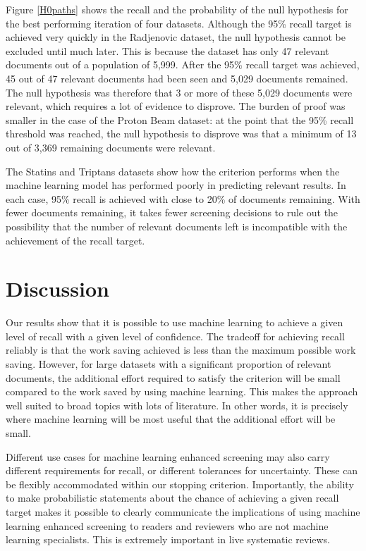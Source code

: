 \documentclass{bmcart}
\begin{document}
	Figure \ref{H0paths} shows the recall and the probability of the null hypothesis for the best performing iteration of four datasets. Although the 95\% recall target is achieved very quickly in the Radjenovic dataset, the null hypothesis cannot be excluded until much later. This is because the dataset has only 47 relevant documents out of a population of 5,999. After the 95\% recall target was achieved, 45 out of 47 relevant documents had been seen and 5,029 documents remained. The null hypothesis was therefore that 3 or more of these 5,029 documents were relevant, which requires a lot of evidence to disprove. The burden of proof was smaller in the case of the Proton Beam dataset: at the point that the 95\% recall threshold was reached, the null hypothesis to disprove was that a minimum of 13 out of 3,369 remaining documents were relevant. 

	The Statins and Triptans datasets show how the criterion performs when the machine learning model has performed poorly in predicting relevant results. In each case, 95\% recall is achieved with close to 20\% of documents remaining. With fewer documents remaining, it takes fewer screening decisions to rule out the possibility that the number of relevant documents left is incompatible with the achievement of the recall target.

	\section*{Discussion}

	Our results show that it is possible to use machine learning to achieve a given level of recall with a given level of confidence. The tradeoff for achieving recall reliably is that the work saving achieved is less than the maximum possible work saving. However, for large datasets with a significant proportion of relevant documents, the additional effort required to satisfy the criterion will be small compared to the work saved by using machine learning. This makes the approach well suited to broad topics with lots of literature. In other words, it is precisely where machine learning will be most useful that the additional effort will be small.

	Different use cases for machine learning enhanced screening may also carry different requirements for recall, or different tolerances for uncertainty. These can be flexibly accommodated within our stopping criterion. Importantly, the ability to make probabilistic statements about the chance of achieving a given recall target makes it possible to clearly communicate the implications of using machine learning enhanced screening to readers and reviewers who are not machine learning specialists. This is extremely important in live systematic reviews.
\end{document}
